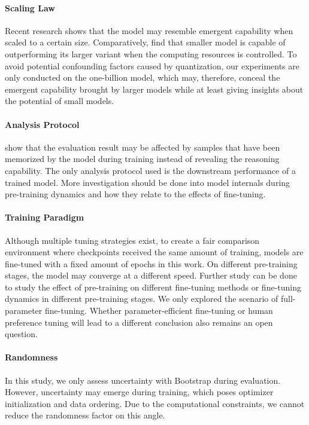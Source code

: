 \documentclass[11pt]{article}
\begin{document}
\paragraph{Scaling Law}
Recent research shows that the model may resemble emergent capability \cite{wei2022emergent} when scaled to a certain size.
Comparatively, \citealp{hassid2024larger} find that smaller model is capable of outperforming its larger variant when the computing resources is controlled.
To avoid potential confounding factors caused by quantization, our experiments are only conducted on the one-billion model, which may, therefore, conceal the emergent capability brought by larger models while at least giving insights about the potential of small models.

\paragraph{Analysis Protocol}
\citealp{wu2023reasoning} show that the evaluation result may be affected by samples that have been memorized by the model during training instead of revealing the reasoning capability.
The only analysis protocol used is the downstream performance of a trained model.
More investigation should be done into model internals during pre-training dynamics and how they relate to the effects of fine-tuning.

\paragraph{Training Paradigm}
Although multiple tuning strategies exist, to create a fair comparison environment where checkpoints received the same amount of training, models are fine-tuned with a fixed amount of epochs in this work.
On different pre-training stages, the model may converge at a different speed.
Further study can be done to study the effect of pre-training on different fine-tuning methods or fine-tuning dynamics in different pre-training stages.
We only explored the scenario of full-parameter fine-tuning.
Whether parameter-efficient fine-tuning or human preference tuning will lead to a different conclusion also remains an open question.

\paragraph{Randomness}
In this study, we only assess uncertainty with Bootstrap during evaluation.
However, uncertainty may emerge during training, which poses optimizer initialization and data ordering.
Due to the computational constraints, we cannot reduce the randomness factor on this angle.
\end{document}
